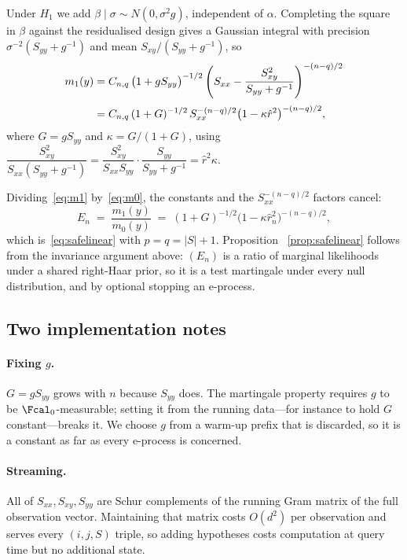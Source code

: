 \begin{appendices}
Under $H_1$ we add $\beta \mid \sigma \sim N(0, \sigma^2 g)$, independent of
$\alpha$. Completing the square in $\beta$ against the residualised design
gives a Gaussian integral with precision $\sigma^{-2}(S_{yy} + g^{-1})$ and
mean $S_{xy}/(S_{yy} + g^{-1})$, so
\begin{align}
m_1(y)
&= C_{n,q} \, \bigl(1 + gS_{yy}\bigr)^{-1/2}
   \left( S_{xx} - \frac{S_{xy}^2}{S_{yy} + g^{-1}} \right)^{-(n-q)/2}
   \notag \\[2pt]
&= C_{n,q} \, (1+G)^{-1/2} \,
   S_{xx}^{-(n-q)/2} \bigl(1 - \kappa \hat r^2\bigr)^{-(n-q)/2},
   \label{eq:m1}
\end{align}
where $G = gS_{yy}$ and $\kappa = G/(1+G)$, using
$\dfrac{S_{xy}^2}{S_{xx}(S_{yy}+g^{-1})}
 = \dfrac{S_{xy}^2}{S_{xx}S_{yy}} \cdot \dfrac{S_{yy}}{S_{yy}+g^{-1}}
 = \hat r^2 \kappa$.

Dividing~\eqref{eq:m1} by~\eqref{eq:m0}, the constants and the
$S_{xx}^{-(n-q)/2}$ factors cancel:
\begin{equation}\label{eq:bf}
E_n \;=\; \frac{m_1(y)}{m_0(y)}
\;=\; (1+G)^{-1/2} \bigl(1 - \kappa \hat r_n^2\bigr)^{-(n-q)/2},
\end{equation}
which is~\eqref{eq:safelinear} with $p = q = |S|+1$. Proposition~%
\ref{prop:safelinear} follows from the invariance argument above:
$(E_n)$ is a ratio of marginal likelihoods under a shared right-Haar prior, so
it is a test martingale under every null distribution, and by optional
stopping an e-process.

\subsection{Two implementation notes}

\paragraph{Fixing $g$.} $G = gS_{yy}$ grows with $n$ because $S_{yy}$ does.
The martingale property requires $g$ to be $\Fcal_0$-measurable; setting it
from the running data---for instance to hold $G$ constant---breaks it. We
choose $g$ from a warm-up prefix that is discarded, so it is a constant as far
as every e-process is concerned.

\paragraph{Streaming.} All of $S_{xx}, S_{xy}, S_{yy}$ are Schur complements
of the running Gram matrix of the full observation vector. Maintaining that
matrix costs $O(d^2)$ per observation and serves every $(i,j,S)$ triple, so
adding hypotheses costs computation at query time but no additional state.


\end{appendices}
